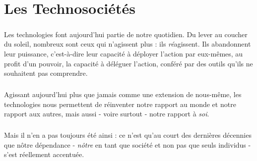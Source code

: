 \chapter{Les Technosociétés}

\paragraph{} Les technologies font aujourd'hui partie de notre quotidien. Du lever au coucher du soleil, nombreux sont
ceux qui n'agissent plus : ils \emph{ré}agissent. Ils abandonnent leur puissance, c'est-à-dire leur capacité à déployer
l'action par eux-mêmes, au profit d'un pouvoir, la capacité à déléguer l'action, conféré par des outils qu'ils ne 
souhaitent pas comprendre.

\paragraph{} Agissant aujourd'hui plus que jamais comme une extension de nous-même, les technologies nous permettent de
réinventer notre rapport au monde et notre rapport aux autres, mais aussi - voire surtout - notre rapport à \emph{soi}.
\cite{Damasio2}

\paragraph{} Mais il n'en a pas toujours été ainsi : ce n'est qu'au court des dernières décennies que nôtre dépendance
- \emph{nôtre} en tant que société et non pas que seuls individus - s'est réellement accentuée.



 
